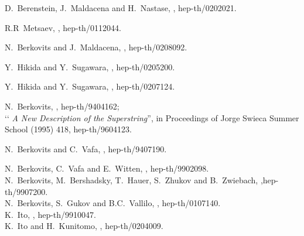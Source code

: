\documentclass[a4paper,seceq,preprint]{ptptex}
\begin{document}
\begin{thebibliography}{99}
D.~Berenstein, J.~Maldacena and H.~Nastase, , 
hep-th/0202021.

R.R~Metsaev, , hep-th/0112044. 

N.~Berkovits and J.~Maldacena, , hep-th/0208092. 

Y.~Hikida and Y.~Sugawara, , hep-th/0205200.

Y.~Hikida and Y.~Sugawara, , hep-th/0207124.

N.~Berkovits, , hep-th/9404162;\\
  \lq\lq\textsl{ A New Description of the Superstring}'', 
in Proceedings of Jorge Swieca Summer School (1995) 418, hep-th/9604123.

N.~Berkovits and C.~Vafa, , hep-th/9407190.

N.~Berkovits, C.~Vafa and E.~Witten, ,
hep-th/9902098.\\
N.~Berkovits, M.~Bershadsky, T.~Hauer, S.~Zhukov and B.~Zwiebach,
,hep-th/9907200.\\
N.~Berkovits, S.~Gukov and B.C.~Vallilo, , 
hep-th/0107140.\\
K.~Ito, , hep-th/9910047.\\
K.~Ito and H.~Kunitomo, , hep-th/0204009.


\end{thebibliography}
\end{document}
